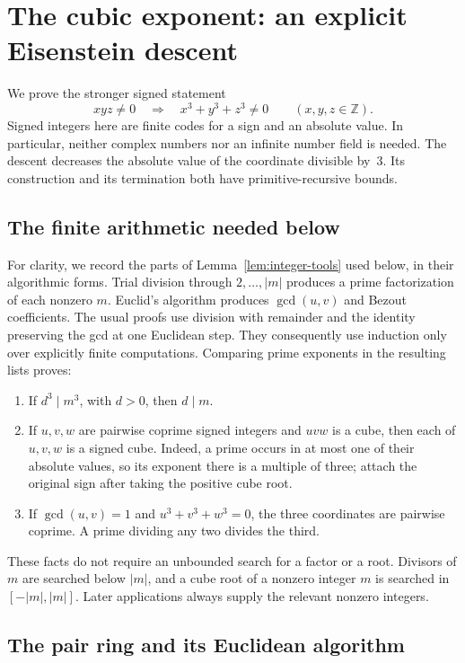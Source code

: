 \section{The cubic exponent: an explicit Eisenstein descent}
\label{sec:three}

We prove the stronger signed statement
\[
  xyz\ne0\quad\Longrightarrow\quad x^3+y^3+z^3\ne0
  \qquad(x,y,z\in\mathbb Z).
\]
Signed integers here are finite codes for a sign and an absolute value.
In particular, neither complex numbers nor an infinite number field is
needed.  The descent decreases the absolute value of the coordinate
divisible by~$3$.  Its construction and its termination both have
primitive-recursive bounds.

\subsection{The finite arithmetic needed below}

For clarity, we record the parts of Lemma~\ref{lem:integer-tools} used
below, in their algorithmic forms.  Trial division through $2,\ldots,|m|$
produces a prime factorization of each nonzero $m$.  Euclid's algorithm
produces $\gcd(u,v)$ and Bezout coefficients.  The usual proofs use division
with remainder and the identity preserving the gcd at one Euclidean
step.  They consequently use induction only over explicitly finite
computations.  Comparing prime exponents in the resulting lists proves:

\begin{enumerate}
\item If $d^3\mid m^3$, with $d>0$, then $d\mid m$.
\item If $u,v,w$ are pairwise coprime signed integers and $uvw$ is a cube,
then each of $u,v,w$ is a signed cube.  Indeed, a prime occurs in at most
one of their absolute values, so its exponent there is a multiple of
three; attach the original sign after taking the positive cube root.
\item If $\gcd(u,v)=1$ and $u^3+v^3+w^3=0$, the three coordinates are
pairwise coprime.  A prime dividing any two divides the third.
\end{enumerate}

These facts do not require an unbounded search for a factor or a root.
Divisors of $m$ are searched below $|m|$, and a cube root of a nonzero
integer $m$ is searched in $[-|m|,|m|]$.  Later applications always supply
the relevant nonzero integers.

\subsection{The pair ring and its Euclidean algorithm}

